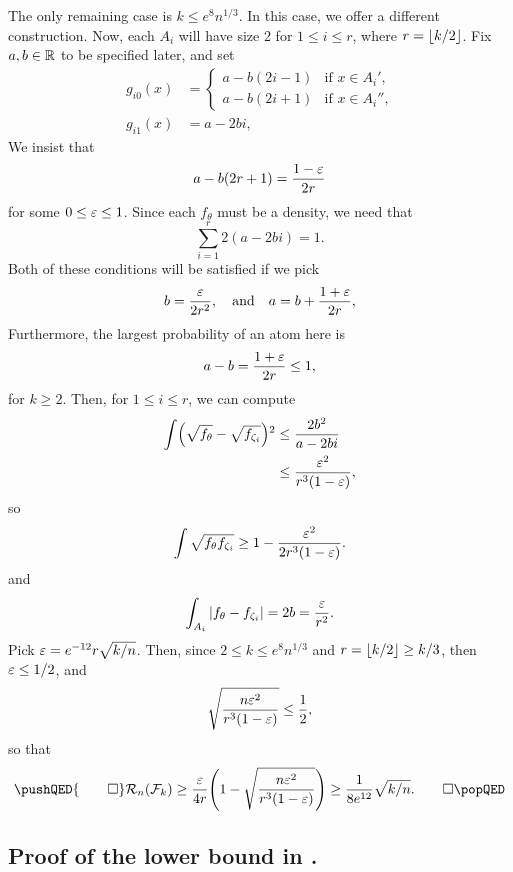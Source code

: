 The only remaining case is $k \le e^8 n^{1/3}$. In this case, we offer
a different construction. Now, each $A_i$ will have size $2$ for
$1 \le i \le r$, where $r = {\lfloor k/2 \rfloor}$. Fix $a, b \in \mathbb{R}$ to be
specified later, and set
\begin{align*}
  g_{i 0}(x) &= \left\{\begin{array}{ll}
                        a - b(2i - 1) & \mbox{if $x \in A_i'$,} \\
                        a - b(2i + 1) & \mbox{if $x \in A_i''$,}
                      \end{array} \right. \\
  g_{i 1}(x) &= a - 2 b i ,
\end{align*}
We insist that
\[
  a - b (2r + 1) = \frac{1 - \varepsilon}{2r}
\]
for some $0 \le \varepsilon \le 1$. Since each $f_\theta$ must be a density,
we need that
\[
  \sum_{i = 1}^r 2(a - 2 bi) = 1 .
\]
Both of these conditions will be satisfied if we pick
\[
  b = \frac{\varepsilon}{2 r^2}, \quad \text{and} \quad a = b + \frac{1 + \varepsilon}{2r} ,
\]
Furthermore, the largest probability of an atom here is
\[
  a - b = \frac{1 + \varepsilon}{2r} \le 1 ,
\]
for $k \ge 2$. Then, for $1 \le i \le r$, we can compute
\begin{align*}
  \int \left(\sqrt{f_\theta} - \sqrt{f_{\zeta_i}}\right)^2 &\le \frac{2 b^2}{a - 2 bi} \\
                                                           &\le \frac{\eps^2}{r^3 (1 - \eps)} ,
\end{align*}
so
\[
  \int \sqrt{f_\theta f_{\zeta_i}} \ge 1 - \frac{\varepsilon^2}{2 r^3(1 - \varepsilon)} .
\]
and
\[
  \int_{A_i} |f_\theta - f_{\zeta_i}| = 2b = \frac{\varepsilon}{r^2} .
\]
Pick $\varepsilon = e^{-12} r \sqrt{k/n}$. Then, since
$2 \le k \le e^8 n^{1/3}$ and $r = {\lfloor k/2 \rfloor} \ge k/3$, then
$\varepsilon \le 1/2$, and
\[
  \sqrt{\frac{n \varepsilon^2}{r^3 (1 - \varepsilon)}} \le \frac{1}{2} ,
\]
so that
\[
  \pushQED{\qed}
  \sR_n(\sF_k) \ge \frac{\eps}{4 r} \left(1 - \sqrt{\frac{n \eps^2}{r^3 (1 - \eps)}}\right) \ge \frac{1}{8 e^{12}} \sqrt{k/n} . \qedhere
  \popQED
\]

\subsection{Proof of the lower bound in .}


